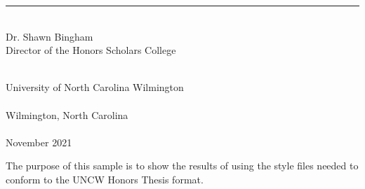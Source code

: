 \documentclass[12 pt]{uncw_thesis}
\theoremstyle{plain}
\theoremstyle{remark}
\theoremstyle{definition}
\begin{document}
\begin{singlespace}
 \\
 \\
\\
    \\ 
    \\
    \rule{6.5cm}{.01in}\\
    Dr. Shawn Bingham
    \\
     Director of the Honors Scholars College \\
\begin{center}   
    \hskip 1pt \\    %
    University of North Carolina Wilmington\\
    \hskip 1pt \\    %
    Wilmington, North Carolina \\
    \hskip 1pt \\    %
    November 2021\\
\end{center}
\end{singlespace}
\newpage

%
%

\newpage
\pagestyle{plain}
\begin{center}
\tableofcontents
\end{center}


%
%
\newpage
{}
The purpose of this sample is to show the results of using the
style files needed to conform to the UNCW Honors Thesis format.

%
%

%
%
\newpage

%
%
\begin{singlespace}

  \setlength{\cftparskip}{1\baselineskip}
\listoftables {}
\newpage
\listoffigures {}
\end{singlespace}
\end{document}
